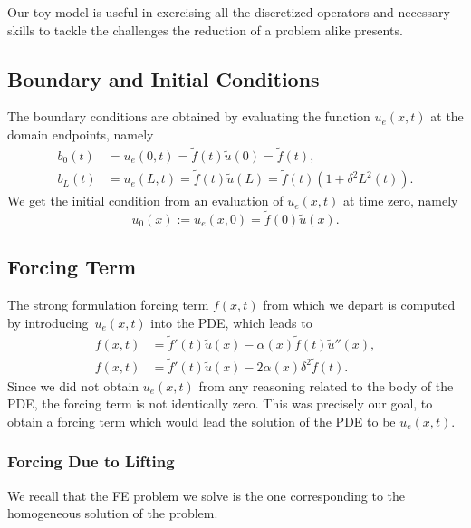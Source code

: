 \documentclass[../main.tex]{subfiles}
\begin{document}
Our toy model is useful in exercising all the discretized operators and necessary skills to tackle the challenges the reduction of a problem alike presents. 

\subsection{Boundary and Initial Conditions}
The boundary conditions are obtained by evaluating the function $u_e(x,t)$ at the domain endpoints, namely 
\begin{subequations}
    \label{eq:1d_fom_mfp_boundary_conditions}
    \begin{align}
        b_0(t) &= u_e(0,t) = \tilde{f}(t) \tilde{u}(0) = \tilde{f}(t), \\
        b_L(t) &= u_e(L,t) = \tilde{f}(t) \tilde{u}(L) = \tilde{f}(t)\left(1 + \delta^2L^2(t)\right).
    \end{align}
\end{subequations}
We get the initial condition from an evaluation of $u_e(x,t)$ at time zero, namely
\begin{equation}
    u_0(x) := u_e(x,0) = \tilde{f}(0) \tilde{u}(x).
\end{equation}

\subsection{Forcing Term}
The strong formulation forcing term $f(x,t)$ from which we depart is computed by introducing~$u_e(x,t)$ into the PDE, which leads to
\begin{subequations}
    \label{eq:1d_fom_mfp_forcing_term}
    \begin{align}
        f(x,t) &= \tilde{f}'(t) \tilde{u}(x) - \alpha(x) \tilde{f}(t) \tilde{u}''(x), \\
        f(x,t) &= \tilde{f}'(t) \tilde{u}(x) - 2 \alpha(x) \delta^2 \tilde{f}(t).
    \end{align}
\end{subequations}
Since we did not obtain $u_e(x,t)$ from any reasoning related to the body of the PDE, 
the forcing term is not identically zero.
This was precisely our goal, to obtain a forcing term which would lead the solution of the PDE to be $u_e(x,t)$. 

\subsubsection{Forcing Due to Lifting}
We recall that the FE problem we solve is the one corresponding to the homogeneous solution of the problem. 
\end{document}
